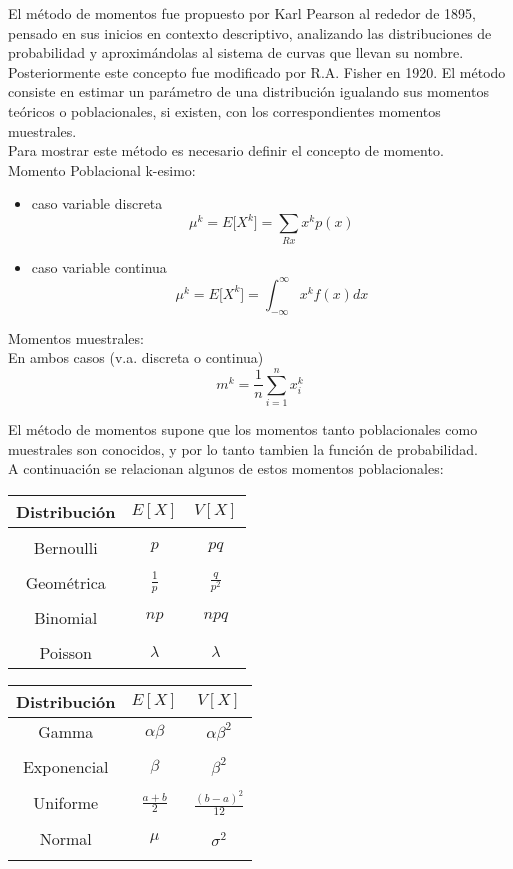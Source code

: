 \documentclass[base=hide,11pt]{elegantbook}
\begin{document}
{El método de momentos fue propuesto por Karl Pearson al rededor de 1895, pensado en sus inicios en contexto descriptivo, analizando las distribuciones de probabilidad y aproximándolas al sistema de curvas que llevan su nombre. Posteriormente este concepto fue modificado por R.A. Fisher en 1920. El método consiste en estimar un parámetro de una distribución igualando sus momentos teóricos o poblacionales, si existen, con los correspondientes momentos muestrales.\\
			
Para mostrar este método es necesario definir el concepto de momento.
			\\
Momento Poblacional k-esimo:
\begin{itemize}
\item caso variable discreta  
$$\mu^{k}=E\big[X^{k}\big]=\sum_{Rx} x^{k}p(x)$$ 
\item caso variable continua
$$\mu^{k}=E\big[X^{k}\big]=\int_{-\infty}^{\infty}x^{k}f(x) dx $$ 
\end{itemize}
Momentos muestrales:\\
En ambos casos (v.a. discreta o continua)
$$m^{k}=\frac{1}{n}\sum_{i=1}^{n} x_{i}^{k} $$
	
El método de momentos supone que los momentos tanto poblacionales como muestrales son conocidos, y por lo tanto tambien la función de probabilidad. \\
A continuación se relacionan algunos de estos momentos poblacionales:\\
			
\begin{center}
\begin{tabular}{ccc}
\hline
Distribución & $E[X]$ & $V[X]$\\
\hline
&&\\
Bernoulli  & $p$  & $pq$\\
&&\\
Geométrica & $\displaystyle\frac{1}{p}$ & $\displaystyle\frac{q}{p^{2}}$\\
&&\\
Binomial &  $np  $& $npq$ \\
&&\\
Poisson & $\lambda$ & $\lambda$ \\
\hline
\end{tabular}	
\hspace{1cm}				
\begin{tabular}{ccc}
\hline
Distribución & $E[X]$ & $V[X]$\\
\hline
Gamma     & $\alpha\beta$ & $\alpha\beta^{2}$\\
&&\\
Exponencial & $\beta$&$\beta^{2}$\\
&&\\
Uniforme &$\displaystyle\frac{a+b}{2}$&$\displaystyle\frac{(b-a)^{2}}{12}$\\
&&\\
Normal   &$\mu$&$\sigma^{2}$\\
&&\\
\hline
\end{tabular}
		

\end{center}}
\end{document}

